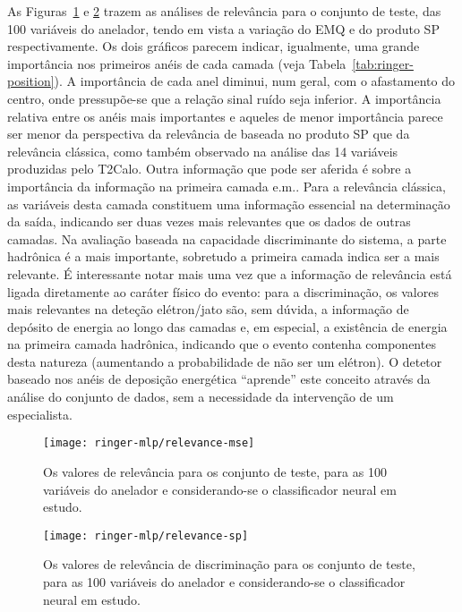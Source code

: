 As Figuras~\ref{fig:ringer-mse-relevance} e \ref{fig:ringer-sp-relevance}
trazem as análises de relevância para o conjunto de teste, das 100 variáveis
do anelador, tendo em vista a variação do EMQ e do produto SP
respectivamente. Os dois gráficos parecem indicar, igualmente, uma grande
importância nos primeiros anéis de cada camada (veja
Tabela~\ref{tab:ringer-position}). A importância de cada anel diminui, num
geral, com o afastamento do centro, onde pressupõe-se que a relação sinal
ruído seja inferior. A importância relativa entre os anéis mais importantes e
aqueles de menor importância parece ser menor da perspectiva da relevância de
baseada no produto SP que da relevância clássica, como também observado na
análise das 14 variáveis produzidas pelo T2Calo. Outra informação que pode ser
aferida é sobre a importância da informação na primeira camada e.m.. Para a
relevância clássica, as variáveis desta camada constituem uma informação
essencial na determinação da saída, indicando ser duas vezes mais relevantes
que os dados de outras camadas. Na avaliação baseada na capacidade
discriminante do sistema, a parte hadrônica é a mais importante, sobretudo a
primeira camada indica ser a mais relevante. É interessante notar mais uma vez
que a informação de relevância está ligada diretamente ao caráter físico do
evento: para a discriminação, os valores mais relevantes na deteção
elétron/jato são, sem dúvida, a informação de depósito de energia ao longo das
camadas e, em especial, a existência de energia na primeira camada hadrônica,
indicando que o evento contenha componentes desta natureza (aumentando a
probabilidade de não ser um elétron). O detetor baseado nos anéis de deposição
energética ``aprende'' este conceito através da análise do conjunto de dados,
sem a necessidade da intervenção de um especialista.

\begin{figure}
\begin{center}
\texttt{[image: ringer-mlp/relevance-mse]}
\end{center}
\caption{Os valores de relevância para os conjunto de teste, para as 100
variáveis do anelador e considerando-se o classificador neural em estudo.}
\label{fig:ringer-mse-relevance}
\end{figure}

\begin{figure}
\begin{center}
\texttt{[image: ringer-mlp/relevance-sp]}
\end{center}
\caption{Os valores de relevância de discriminação para os conjunto de teste,
para as 100 variáveis do anelador e considerando-se o classificador neural em
estudo.}
\label{fig:ringer-sp-relevance}
\end{figure}

